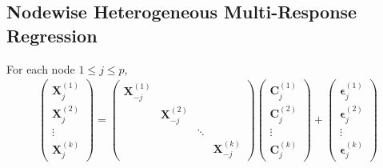 \documentclass[twoside]{article}
\begin{document}
\subsection*{Nodewise Heterogeneous Multi-Response Regression}
For each node $1\leq j\leq p$, 
\begin{align*}
    \begin{pmatrix}
        \mathbf{X}_j^{(1)}\\
        \mathbf{X}_j^{(2)}\\
        \vdots\\
        \mathbf{X}_j^{(k)}
    \end{pmatrix} = \begin{pmatrix}
        \mathbf{X}_{-j}^{(1)} \\
        & \mathbf{X}_{-j}^{(2)} \\
        & & \ddots \\
        & & & \mathbf{X}_{-j}^{(k)}
    \end{pmatrix} \begin{pmatrix}
        \mathbf{C}_j^{(1)}\\
        \mathbf{C}_j^{(2)}\\
        \vdots\\
        \mathbf{C}_j^{(k)}
    \end{pmatrix}
    + \begin{pmatrix}
        \boldsymbol{\epsilon}_j^{(1)}\\
        \boldsymbol{\epsilon}_j^{(2)}\\
        \vdots\\
        \boldsymbol{\epsilon}_j^{(k)}
    \end{pmatrix}
\end{align*}


\newpage


\end{document}

